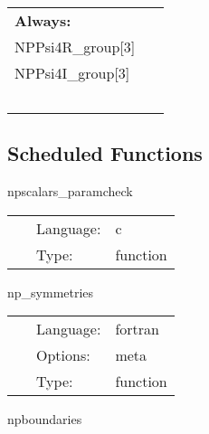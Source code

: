  \begin{tabular*}{160mm}{ll} 

{\bf Always:}&  ~ \\ 
 NPPsi4R\_group[3] & ~\\ 
 NPPsi4I\_group[3] & ~\\ 
~ & ~\\ 
\end{tabular*} 


\subsection*{Scheduled Functions}
\vspace{5mm}


\hspace{5mm} npscalars\_paramcheck 

\hspace{5mm}{\it check npscalars parameters for consistency } 


\hspace{5mm}

 \begin{tabular*}{160mm}{cll} 
~ & Language:  & c \\ 
~ & Type:  & function \\ 
\end{tabular*} 


\vspace{5mm}


\hspace{5mm} np\_symmetries 

\hspace{5mm}{\it set symmetries for grid functions } 


\hspace{5mm}

 \begin{tabular*}{160mm}{cll} 
~ & Language:  & fortran \\ 
~ & Options:  & meta \\ 
~ & Type:  & function \\ 
\end{tabular*} 


\vspace{5mm}


\hspace{5mm} npboundaries 

